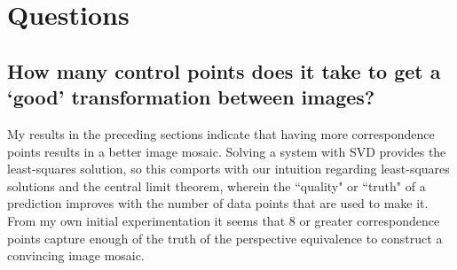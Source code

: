 \documentclass[]{article}
\begin{document}
\newpage

\section{Questions}
	\subsection{How many control points does it take to get a `good' transformation between images?}
	My results in the preceding sections indicate that having more correspondence points results in a better image mosaic. Solving a system with SVD provides the least-squares solution, so this comports with our intuition regarding least-squares solutions and the central limit theorem, wherein the ``quality" or ``truth" of a prediction improves with the number of data points that are used to make it. From my own initial experimentation it seems that 8 or greater correspondence points capture enough of the truth of the perspective equivalence to construct a convincing image mosaic.
	
\end{document}
